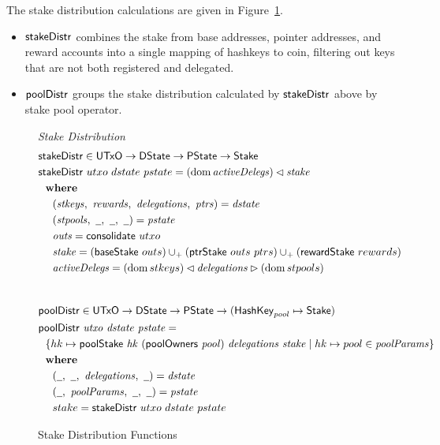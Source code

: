 The stake distribution calculations are given in Figure~\ref{fig:functions:stake-distribution}.
\begin{itemize}
  \item $\mathsf{stakeDistr}$ combines the stake from base addresses, pointer addresses, and reward
    accounts into a single mapping of hashkeys to coin, filtering out keys that are not both
    registered and delegated.
  \item $\mathsf{poolDistr}$ groups the stake distribution calculated by $\mathsf{stakeDistr}$ above
    by stake pool operator.
\end{itemize}

\begin{figure}[htb]
  \emph{Stake Distribution}
  \begin{align*}
      & \fun{stakeDistr} \in \UTxO \to \DState \to \PState \to \Stake \\
      & \fun{stakeDistr}~{utxo}~{dstate}~{pstate} =
          (\dom{\var{activeDelegs}})\restrictdom\var{stake}\\
      & \where \\
      & ~~~~ (\var{stkeys},~\var{rewards},~\var{delegations},~\var{ptrs}) = \var{dstate} \\
      & ~~~~ (\var{stpools},~\wcard,~\wcard,~\wcard) = \var{pstate} \\
      & ~~~~ \var{outs} = \fun{consolidate}~{utxo} \\
      & ~~~~ \var{stake} = (\fun{baseStake}~{outs})
                             \unionoverridePlus (\fun{ptrStake}~{outs}~{ptrs})
                             \unionoverridePlus (\fun{rewardStake}~{rewards}) \\
      & ~~~~ \var{activeDelegs} =
               (\dom{stkeys}) \restrictdom \var{delegations} \restrictrange (\dom{stpools}) \\
      \nextdef
      & \fun{poolDistr} \in \UTxO \to \DState \to \PState \to (\HashKey_{pool} \mapsto \Stake) \\
      & \poolDistr{utxo}{dstate}{pstate} = \\
      & ~~ \{hk \mapsto \poolStake{hk}{(\fun{poolOwners}~\var{pool})}{delegations}{stake}
           \mid
           hk\mapsto pool \in \var{poolParams} \} \\
      & \where \\
      & ~~~~ (\wcard,~\wcard,~\var{delegations},~\wcard) = \var{dstate} \\
      & ~~~~ (\wcard,~\var{poolParams},~\wcard,~\wcard) = \var{pstate} \\
      & ~~~~ stake = \fun{stakeDistr}~{utxo}~{dstate}~{pstate}\\
  \end{align*}

  \caption{Stake Distribution Functions}
  \label{fig:functions:stake-distribution}
\end{figure}

